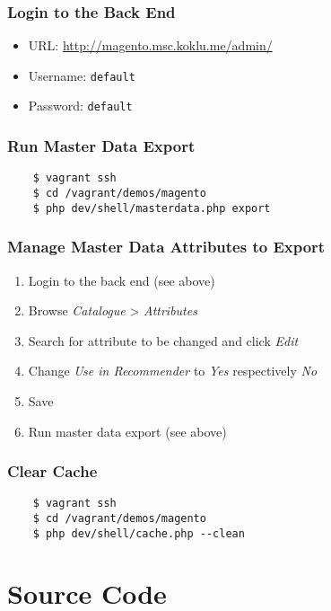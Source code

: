 \subsubsection{Login to the Back End}

\begin{itemize}
\item URL: \url{http://magento.msc.koklu.me/admin/}
\item Username: \texttt{default}
\item Password: \texttt{default}
\end{itemize}

\subsubsection{Run Master Data Export}

\begin{verbatim}
    $ vagrant ssh
    $ cd /vagrant/demos/magento
    $ php dev/shell/masterdata.php export
\end{verbatim}

\subsubsection{Manage Master Data Attributes to Export}

\begin{enumerate}
\item Login to the back end (see above)
\item Browse \emph{Catalogue} > \emph{Attributes}
\item Search for attribute to be changed and click \emph{Edit}
\item Change \emph{Use in Recommender} to \emph{Yes} respectively \emph{No}
\item Save
\item Run master data export (see above)
\end{enumerate}

\subsubsection{Clear Cache}

\begin{verbatim}
    $ vagrant ssh
    $ cd /vagrant/demos/magento
    $ php dev/shell/cache.php --clean
\end{verbatim}


\section{Source Code}

